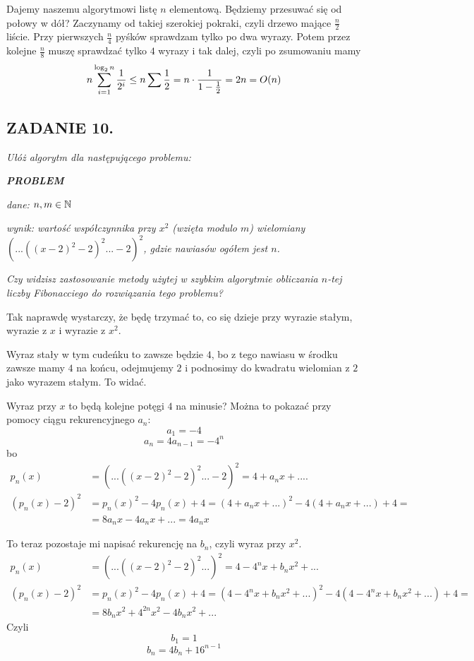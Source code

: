 \documentclass{article}
\begin{document}
Dajemy naszemu algorytmowi listę $n$ elementową. Będziemy przesuwać się od połowy w dół? Zaczynamy od takiej szerokiej pokraki, czyli drzewo mające $\frac n2$ liście. Przy pierwszych $\frac n4$ pyśków sprawdzam tylko po dwa wyrazy. Potem przez kolejne $\frac n8$ muszę sprawdzać tylko $4$ wyrazy i tak dalej, czyli po zsumowaniu mamy
$$n\sum\limits_{i=1}^{\log_2n}{1\over 2^{i}}\leq n\sum\frac12=n\cdot {1\over 1-\frac12}=2n=O(n)$$

\subsection*{ZADANIE 10.}
\emph{Ułóż algorytm dla następującego problemu:}

\emph{\textbf{PROBLEM}}

\emph{dane: $n,m\in\mathbb{N}$}

\emph{wynik: wartość współczynnika przy $x^2$ (wzięta modulo $m$) wielomiany $(...((x-2)^2-2)^2...-2)^2$, gdzie nawiasów ogółem jest $n$.}

\emph{Czy widzisz zastosowanie metody użytej w szybkim algorytmie obliczania $n$-tej liczby Fibonacciego do rozwiązania tego problemu?}
\medskip

Tak naprawdę wystarczy, że będę trzymać to, co się dzieje przy wyrazie stałym, wyrazie z $x$ i wyrazie z $x^2$. 

Wyraz stały w tym cudeńku to zawsze będzie $4$, bo z tego nawiasu w środku zawsze mamy $4$ na końcu, odejmujemy $2$ i podnosimy do kwadratu wielomian z $2$ jako wyrazem stałym. To widać. 

Wyraz przy $x$ to będą kolejne potęgi $4$ na minusie? Można to pokazać przy pomocy ciągu rekurencyjnego $a_n$:
$$a_1=-4$$
$$a_n=4a_{n-1}=-4^n$$
bo
\begin{align*}
    p_n(x)&=(...((x-2)^2-2)^2...-2)^2=4+a_nx+....\\
    (p_n(x)-2)^2&=p_n(x)^2-4p_n(x)+4=(4+a_nx+...)^2-4(4+a_nx+...)+4=\\
    &=8a_nx-4a_nx+...=4a_nx
\end{align*}

To teraz pozostaje mi napisać rekurencję na $b_n$, czyli wyraz przy $x^2$.
\begin{align*}
    p_n(x)&=(...((x-2)^2-2)^2...)^2=4-4^nx+b_nx^2+...\\
    (p_n(x)-2)^2&=p_n(x)^2-4p_n(x)+4=(4-4^nx+b_nx^2+...)^2-4(4-4^nx+b_nx^2+...)+4=\\
    &=8b_nx^2+4^{2n}x^2-4b_nx^2+...
\end{align*}
Czyli
$$b_1=1$$
$$b_n=4b_n+16^{n-1}$$
\end{document}
